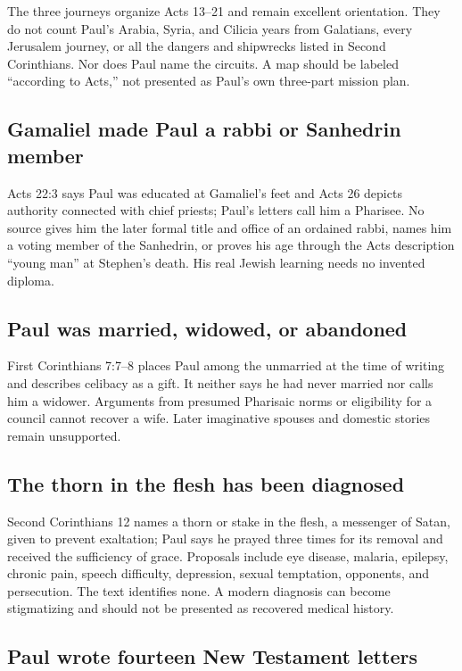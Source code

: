 The three journeys organize Acts 13--21 and remain excellent orientation. They
do not count Paul's Arabia, Syria, and Cilicia years from Galatians, every
Jerusalem journey, or all the dangers and shipwrecks listed in Second
Corinthians. Nor does Paul name the circuits. A map should be labeled
``according to Acts,'' not presented as Paul's own three-part mission plan.

\subsection{Gamaliel made Paul a rabbi or Sanhedrin member}

Acts 22:3 says Paul was educated at Gamaliel's feet and Acts 26 depicts
authority connected with chief priests; Paul's letters call him a Pharisee.
No source gives him the later formal title and office of an ordained rabbi,
names him a voting member of the Sanhedrin, or proves his age through the Acts
description ``young man'' at Stephen's death. His real Jewish learning needs no
invented diploma.

\subsection{Paul was married, widowed, or abandoned}

First Corinthians 7:7--8 places Paul among the unmarried at the time of
writing and describes celibacy as a gift. It neither says he had never married
nor calls him a widower. Arguments from presumed Pharisaic norms or eligibility
for a council cannot recover a wife. Later imaginative spouses and domestic
stories remain unsupported.

\subsection{The thorn in the flesh has been diagnosed}

Second Corinthians 12 names a thorn or stake in the flesh, a messenger of
Satan, given to prevent exaltation; Paul says he prayed three times for its
removal and received the sufficiency of grace. Proposals include eye disease,
malaria, epilepsy, chronic pain, speech difficulty, depression, sexual
temptation, opponents, and persecution. The text identifies none. A modern
diagnosis can become stigmatizing and should not be presented as recovered
medical history.

\subsection{Paul wrote fourteen New Testament letters}

